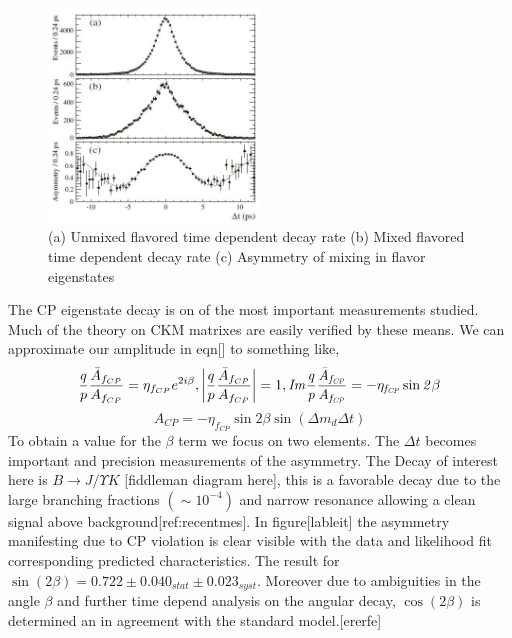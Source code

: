  \begin{figure}[h]
\centering
\includegraphics[width=0.5\textwidth]{figs/Flavourosscilatons.JPG}
\caption{(a) Unmixed flavored time dependent decay rate (b) Mixed flavored time dependent decay rate (c) Asymmetry of mixing in flavor eigenstates}
\label{BBD}
\end{figure}

The CP eigenstate decay is on of the most important measurements studied. Much of the theory on CKM matrixes are easily verified by these means. We can approximate our amplitude in eqn[] to something like,
\[\frac{q}{p}\frac{\bar{A}_{f_{CP}}}{A_{f_{CP}}}=\eta_{f_{CP}}e^{2i\beta}, \left|\frac{q}{p}\frac{\bar{A}_{f_{CP}}}{A_{f_{CP}}}\right|=1, \it{I}m\frac{q}{p}\frac{\bar{A}_{f_{CP}}}{A_{f_{CP}}}=-\eta_{f_{CP}}\sin2\beta\]
\[A_{CP}=-\eta_{f_{CP}}\sin2\beta\sin(\Delta m_d \Delta t)\]
To obtain a value for the $\beta $ term we focus on two elements. The $\Delta t$ becomes important and precision measurements of the asymmetry. The Decay of interest here is $B\rightarrow J/\Upsilon K$ [fiddleman diagram here], this is a favorable decay due to the large branching fractions $(\sim 10^{-4})$ and narrow resonance allowing a clean signal above background[ref:recentmes]. In figure[lableit] the asymmetry manifesting due to CP violation is clear visible with the data and likelihood fit corresponding predicted characteristics. The result for $\sin (2\beta) =0.722\pm 0.040_{stat} \pm0.023_{syst}$. Moreover due to ambiguities in the angle $\beta$  and further time depend analysis on the angular decay, $\cos(2\beta)$ is determined an in agreement with the standard model.[ererfe]

